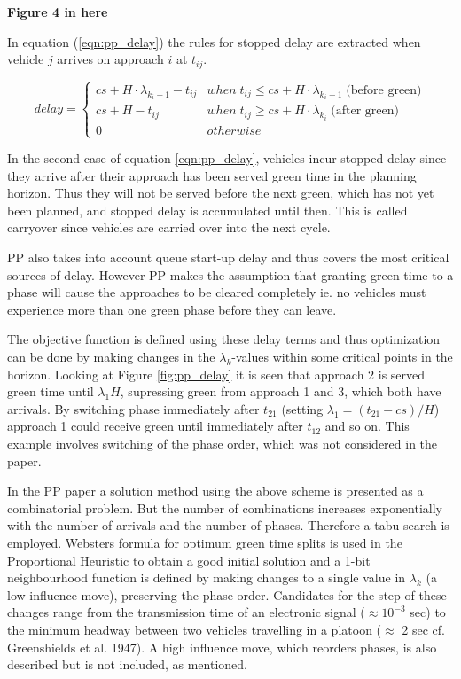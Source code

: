 \begin{center}
{\bf Figure 4 in here}
\end{center}

In equation (\ref{eqn:pp_delay}) the rules for stopped delay are
extracted when vehicle $j$ arrives on approach $i$ at $t_{ij}$.

\begin{equation}
delay = 
\begin{cases}
cs + H \cdot \lambda_{k_i-1} - t_{ij} & when \; t_{ij} \leq cs + H \cdot \lambda_{k_i-1} \; \mbox{(before green)}  \\
cs + H - t_{ij} & when \; t_{ij} \geq cs + H \cdot \lambda_{k_i} \; \mbox{(after green)}  \\
0 & otherwise
\end{cases}
\label{eqn:pp_delay}
\end{equation}

In the second case of equation \ref{eqn:pp_delay}, vehicles incur
stopped delay since they arrive after their approach has been served
green time in the planning horizon. Thus they will not be served
before the next green, which has not yet been planned, and stopped
delay is accumulated until then. This is called carryover since
vehicles are carried over into the next cycle.

PP also takes into account queue start-up delay and thus covers the
most critical sources of delay. However PP makes the assumption that
granting green time to a phase will cause the approaches to be
cleared completely ie. no vehicles must experience more than one green
phase before they can leave.

The objective function is defined using these delay terms and thus
optimization can be done by making changes in the $\lambda_k$-values
within some critical points in the horizon. Looking at Figure
\ref{fig:pp_delay} it is seen that approach 2 is served green time
until $\lambda_1 H$, supressing green from approach 1 and 3, which
both have arrivals. By switching phase immediately after $t_{21}$
(setting $\lambda_1 = (t_{21} - cs)/H$) approach 1 could receive green
until immediately after $t_{12}$ and so on. This example involves
switching of the phase order, which was not considered in the paper.

In the PP paper \citet{1} a solution method using the above scheme is
presented as a combinatorial problem. But the number of combinations
increases exponentially with the number of arrivals and the number of
phases. Therefore a tabu search is employed. Websters formula for
optimum green time splits is used in the Proportional Heuristic to
obtain a good initial solution and a 1-bit neighbourhood function is
defined by making changes to a single value in $\lambda_k$ (a low
influence move), preserving the phase order. Candidates for the step
of these changes range from the transmission time of an electronic
signal ($\approx 10^{-3}$ sec) to the minimum headway between two
vehicles travelling in a platoon ($\approx$ 2 sec cf. Greenshields et
al. 1947).  A high influence move, which reorders phases, is also
described but is not included, as mentioned.

